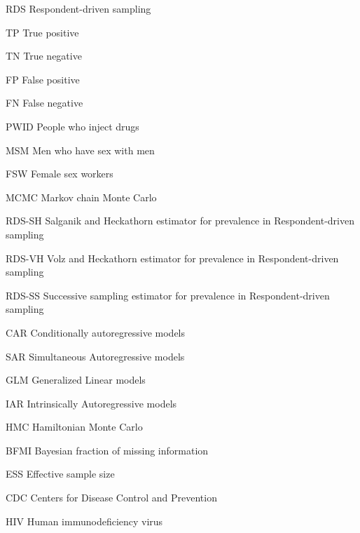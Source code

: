 \begin{siglas}
    \item[RDS] Respondent-driven sampling
    \item[TP] True positive 
    \item[TN] True negative
    \item[FP] False positive
    \item[FN] False negative
    \item[PWID] People who inject drugs
    \item[MSM] Men who have sex with men
    \item[FSW] Female sex workers      
    \item[MCMC] Markov chain Monte Carlo 
    \item[RDS-SH] Salganik and Heckathorn estimator for prevalence in
    Respondent-driven sampling 
    \item[RDS-VH] Volz and Heckathorn estimator for prevalence in
    Respondent-driven sampling
    \item[RDS-SS] Successive sampling estimator for prevalence in
    Respondent-driven sampling 
    \item[CAR] Conditionally autoregressive models
    \item[SAR] Simultaneous Autoregressive models
    \item[GLM] Generalized Linear models  
    \item[IAR] Intrinsically Autoregressive models
    \item[HMC] Hamiltonian Monte Carlo
    \item[BFMI] Bayesian fraction of missing information  
    \item[ESS] Effective sample size
    \item[CDC] Centers for Disease Control and Prevention
    \item[HIV] Human immunodeficiency virus  
  \end{siglas}
  

